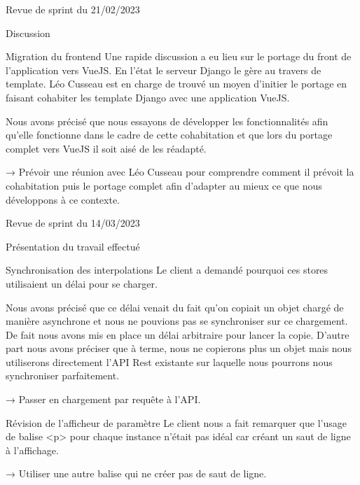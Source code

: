 \documentclass[]{article}
\begin{document}
{\begin{section}{Revue de sprint du 21/02/2023}
 \begin{subsection}{Discussion}
     \begin{subsubsection}{Migration du frontend}
         Une rapide discussion a eu lieu sur le portage du front de l’application vers VueJS. En l’état le serveur Django le gère au travers de template. Léo Cusseau est en charge de trouvé un moyen d’initier le portage en faisant cohabiter les template Django avec une application VueJS.

         Nous avons précisé que nous essayons de développer les fonctionnalités afin qu’elle fonctionne dans le cadre de cette cohabitation et que lors du portage complet vers VueJS il soit aisé de les réadapté.

         → Prévoir une réunion avec Léo Cusseau pour comprendre comment il prévoit la cohabitation puis le portage complet afin d’adapter au mieux ce que nous développons à ce contexte.
     \end{subsubsection}
 \end{subsection}
\end{section}

\begin{section}{Revue de sprint du 14/03/2023}
 \begin{subsection}{Présentation du travail effectué}
     \begin{subsubsection}{Synchronisation des interpolations}
         Le client a demandé pourquoi ces stores utilisaient un délai pour se charger.

         Nous avons précisé que ce délai venait du fait qu’on copiait un objet chargé de manière asynchrone et nous ne pouvions pas se synchroniser sur ce chargement. De fait nous avons mis en place un délai arbitraire pour lancer la copie. D’autre part nous avons préciser que à terme, nous ne copierons plus un objet mais nous utiliserons directement l’API Rest existante sur laquelle nous pourrons nous synchroniser parfaitement.

         → Passer en chargement par requête à l’API.
     \end{subsubsection}

     \begin{subsubsection}{Révision de l’afficheur de paramètre}
         Le client nous a fait remarquer que l’usage de balise <p> pour chaque instance n’était pas idéal car créant un saut de ligne à l’affichage.

         → Utiliser une autre balise qui ne créer pas de saut de ligne.
     \end{subsubsection}
 \end{subsection}


\end{section}}
\end{document}
